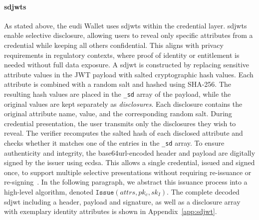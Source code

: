 \paragraph{\acrshort{sdjwt}s}
As stated above, the \acrshort{eudi} Wallet uses \acrshort{sdjwt}s within the credential layer. \acrshort{sdjwt}s enable selective disclosure, allowing users to reveal only specific attributes from a credential while keeping all others confidential. This aligns with privacy requirements in regulatory contexts, where proof of identity or entitlement is needed without full data exposure. A \acrshort{sdjwt} is constructed by replacing sensitive attribute values in the JWT payload with salted cryptographic hash values. Each attribute is combined with a random salt and hashed using SHA-256. The resulting hash values are placed in the \texttt{\_sd} array of the payload, while the original values are kept separately as \textit{disclosures}. Each disclosure contains the original attribute name, value, and the corresponding random salt. During credential presentation, the user transmits only the disclosures they wish to reveal. The verifier recomputes the salted hash of each disclosed attribute and checks whether it matches one of the entries in the \texttt{\_sd} array. To ensure authenticity and integrity, the base64url-encoded header and payload are digitally signed by the issuer using \acrshort{ecdsa}. This allows a single credential, issued and signed once, to support multiple selective presentations without requiring re-issuance or re-signing~\cite{IETF-SDJWT-07}. In the following paragraph, we abstract this issuance process into a high-level algorithm, denoted \(\texttt{Issue}(attrs, pk_c, sk_I)\). The complete decoded \acrshort{sdjwt} including a header, payload and signature, as well as a disclosure array with exemplary identity attributes is shown in Appendix~\ref{app:sdjwt}.

